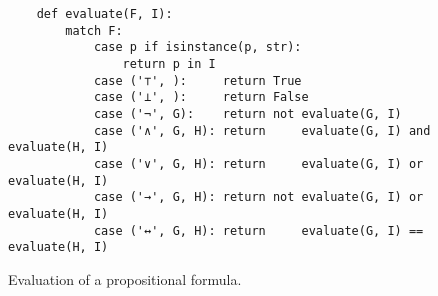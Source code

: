 \begin{figure}[!ht]
  \centering
\begin{verbatim}
    def evaluate(F, I):
        match F:
            case p if isinstance(p, str): 
                return p in I
            case ('⊤', ):     return True
            case ('⊥', ):     return False
            case ('¬', G):    return not evaluate(G, I)
            case ('∧', G, H): return     evaluate(G, I) and evaluate(H, I)
            case ('∨', G, H): return     evaluate(G, I) or  evaluate(H, I)
            case ('→', G, H): return not evaluate(G, I) or  evaluate(H, I)
            case ('↔', G, H): return     evaluate(G, I) ==  evaluate(H, I)
\end{verbatim}
\vspace*{-0.3cm}
  \caption{Evaluation of a propositional formula.}
  \label{fig:evaluate.py}
\end{figure} 


